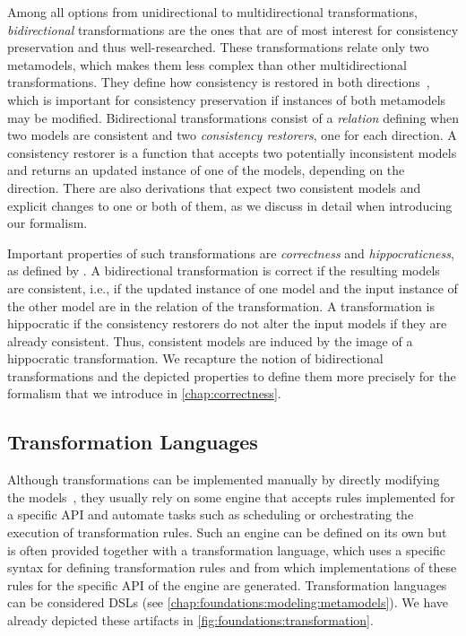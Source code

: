 
Among all options from unidirectional to multidirectional transformations, \emph{bidirectional} transformations are the ones that are of most interest for consistency preservation and thus well-researched.
These transformations relate only two metamodels, which makes them less complex than other multidirectional transformations.
They define how consistency is restored in both directions~\cite{stevens2010sosym}, which is important for consistency preservation if instances of both metamodels may be modified.
Bidirectional transformations consist of a \emph{relation} defining when two models are consistent and two \emph{consistency restorers}, one for each direction.
A consistency restorer is a function that accepts two potentially inconsistent models and returns an updated instance of one of the models, depending on the direction.
There are also derivations that expect two consistent models and explicit changes to one or both of them, as we discuss in detail when introducing our formalism.

Important properties of such transformations are \emph{correctness} and \emph{hippocraticness}, as defined by \textcite{stevens2010sosym}.
A bidirectional transformation is correct if the resulting models are consistent, i.e., if the updated instance of one model and the input instance of the other model are in the relation of the transformation.
A transformation is hippocratic if the consistency restorers do not alter the input models if they are already consistent.
Thus, consistent models are induced by the image of a hippocratic transformation.
We recapture the notion of bidirectional transformations and the depicted properties to define them more precisely for the formalism that we introduce in \autoref{chap:correctness}.


\subsection{Transformation Languages}
\label{chap:foundations:transformations:languages}

Although transformations can be implemented manually by directly modifying the models~\cite[p.~16]{czarnecki2006a}, they usually rely on some engine that accepts rules implemented for a specific \gls{API} and automate tasks such as scheduling or orchestrating the execution of transformation rules.
Such an engine can be defined on its own but is often provided together with a transformation language, which uses a specific syntax for defining transformation rules and from which implementations of these rules for the specific \gls{API} of the engine are generated.
Transformation languages can be considered \glspl{DSL} (see \autoref{chap:foundations:modeling:metamodels}).
We have already depicted these artifacts in \autoref{fig:foundations:transformation}.

